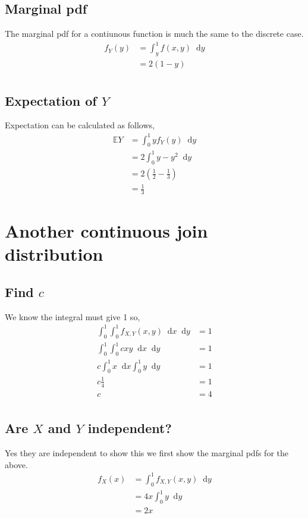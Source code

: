\documentclass{article}
\newcommand{\diff}{\mathop{}\!\mathrm{d}}
\newcommand{\expect}{\mathbb{E}}
\begin{document}
\subsection{Marginal pdf}
The marginal pdf for a contiunous function is much the same to the discrete
case.
\begin{align*}
    f_Y(y) &= \int_y^1 f(x,y) \diff y \\
    &= 2(1-y) \\
\end{align*}

\subsection{Expectation of $Y$}
Expectation can be calculated as follows,
\begin{align*}
    \expect Y &= \int_0^1 y f_Y(y) \diff y \\
    &= 2 \int_0^1 y - y^2 \diff y \\
    &= 2 \left(\frac{1}{2} - \frac{1}{3}\right) \\
    &= \frac{1}{3}
\end{align*}

\section{Another continuous join distribution}
\subsection{Find $c$}
We know the integral must give 1 so,
\begin{align*}
    \int_0^1 \int_0^1 f_{X,Y}(x,y) \diff x \diff y &= 1 \\
    \int_0^1 \int_0^1 cxy \diff x \diff y &= 1 \\
    c \int_0^1 x \diff x \int_0^1 y \diff y &= 1 \\
    c \frac{1}{4} &= 1 \\
    c &= 4 \\
\end{align*}

\subsection{Are $X$ and $Y$ independent?}
Yes they are independent to show this we first show the marginal pdfs
for the above.
\begin{align*}
    f_X(x) &= \int_0^1 f_{X,Y}(x,y) \diff y \\
    &= 4x\int_0^1 y \diff y \\
    &= 2x \\
\end{align*}
\end{document}
